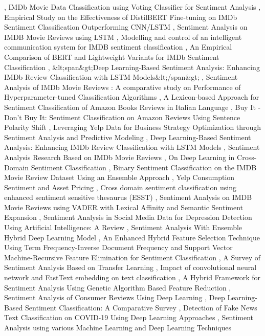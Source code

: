 \documentclass{article}
\begin{document}
\cite{lindsentiment6c9bc9d6}, IMDb Movie Data Classification using Voting Classifier for Sentiment Analysis \cite{kaushik2022imdb7b5a4856}, Empirical Study on the Effectiveness of DistilBERT Fine-tuning on IMDb Sentiment Classification Outperforming CNN/LSTM \cite{yuan2026empirical5a975446}, Sentiment Analysis on IMDB Movie Reviews using LSTM \cite{choudhary2025sentimenta52cc157}, Modelling and control of an intelligent communication system for IMDB sentiment classification \cite{yang2025modelling8e1aaa88}, An Empirical Comparison of BERT and Lightweight Variants for IMDb Sentiment Classification \cite{wu2026empirical56d5f7df}, \&lt;span\&gt;Deep Learning-Based Sentiment Analysis: Enhancing IMDb Review Classification with LSTM Models\&lt;/span\&gt; \cite{kalla2025spanc8735c67}, Sentiment Analysis of IMDb Movie Reviews : A comparative study on Performance of Hyperparameter-tuned Classification Algorithms \cite{ghosh2022sentiment2060df3c}, A Lexicon-based Approach for Sentiment Classification of Amazon Books Reviews in Italian Language \cite{chiavetta2016lexiconbased0860c873}, Buy It - Don’t Buy It: Sentiment Classification on Amazon Reviews Using Sentence Polarity Shift \cite{orimaye2012buyd50ada57}, Leveraging Yelp Data for Business Strategy Optimization through Sentiment Analysis and Predictive Modeling \cite{korada2025leveraging6ec8db92}, Deep Learning-Based Sentiment Analysis: Enhancing IMDb Review Classification with LSTM Models \cite{varadharajan2025deep223eb57d}, Sentiment Analysis Research Based on IMDb Movie Reviews \cite{x2026sentiment260218c3}, On Deep Learning in Cross-Domain Sentiment Classification \cite{domeniconi2017deep593e4546}, Binary Sentiment Classification on the IMDB Movie Review Dataset Using an Ensemble Approach \cite{dongre2025binary665b372b}, Yelp Consumption Sentiment and Asset Pricing \cite{jacoby2024yelpa2b73b30}, Cross domain sentiment classification using enhanced sentiment sensitive thesaurus (ESST) \cite{sanju2013cross26b4ce16}, Sentiment Analysis on IMDB Movie Reviews using VADER with Lexical Affinity and Semantic Sentiment Expansion \cite{dsouza2023sentiment9a66f432}, Sentiment Analysis in Social Media Data for Depression Detection Using Artificial Intelligence: A Review \cite{babu2021sentiment5b478c38}, Sentiment Analysis With Ensemble Hybrid Deep Learning Model \cite{tan2022sentiment4832d81e}, An Enhanced Hybrid Feature Selection Technique Using Term Frequency-Inverse Document Frequency and Support Vector Machine-Recursive Feature Elimination for Sentiment Classification \cite{nafis2021enhanced8d424bec}, A Survey of Sentiment Analysis Based on Transfer Learning \cite{liu2019survey6f8551f6}, Impact of convolutional neural network and FastText embedding on text classification \cite{umer2022impact43feb507}, A Hybrid Framework for Sentiment Analysis Using Genetic Algorithm Based Feature Reduction \cite{iqbal2019hybridf5ede317}, Sentiment Analysis of Consumer Reviews Using Deep Learning \cite{iqbal2022sentimentd18b9ffb}, Deep Learning-Based Sentiment Classification: A Comparative Survey \cite{mabrouk2020deepe59e339e}, Detection of Fake News Text Classification on COVID-19 Using Deep Learning Approaches \cite{bangyal2021detection2da80cf9}, Sentiment Analysis using various Machine Learning and Deep Learning Techniques 
\end{document}
